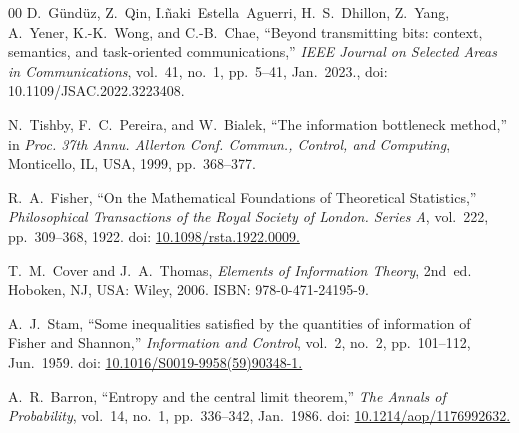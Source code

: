 \documentclass[conference]{IEEEtran}
\begin{document}
\begin{thebibliography}{00}
D.~G{\"u}nd{\"u}z, Z.~Qin, I.{\~n}aki~Estella~Aguerri, H.~S.~Dhillon, Z.~Yang, A.~Yener, K.-K.~Wong, and C.-B.~Chae,
``Beyond transmitting bits: context, semantics, and task-oriented communications,''
\emph{IEEE Journal on Selected Areas in Communications}, vol.~41, no.~1, pp.~5--41, Jan.~2023., 
doi: 10.1109/JSAC.2022.3223408.

N.~Tishby, F.~C.~Pereira, and W.~Bialek, ``The information bottleneck method,''
in \emph{Proc. 37th Annu. Allerton Conf. Commun., Control, and Computing},
Monticello, IL, USA, 1999, pp.~368--377.

R.~A.~Fisher,
``On the Mathematical Foundations of Theoretical Statistics,''
\textit{Philosophical Transactions of the Royal Society of London. Series A},
vol.~222, pp.~309--368, 1922.
doi: \href{https://doi.org/10.1098/rsta.1922.0009.}{10.1098/rsta.1922.0009.}

T.~M.~Cover and J.~A.~Thomas,
\textit{Elements of Information Theory}, 2nd~ed.
Hoboken, NJ, USA: Wiley, 2006. ISBN: 978-0-471-24195-9.


A.~J.~Stam,
``Some inequalities satisfied by the quantities of information of Fisher and Shannon,''
\textit{Information and Control}, vol.~2, no.~2, pp.~101--112, Jun.~1959.
doi: \href{https://doi.org/10.1016/S0019-9958(59)90348-1}{10.1016/S0019-9958(59)90348-1.}

A.~R.~Barron,
``Entropy and the central limit theorem,''
\textit{The Annals of Probability}, vol.~14, no.~1, pp.~336--342, Jan.~1986.
doi: \href{https://doi.org/10.1214/aop/1176992632.}{10.1214/aop/1176992632.}



\end{thebibliography}


\end{document}
